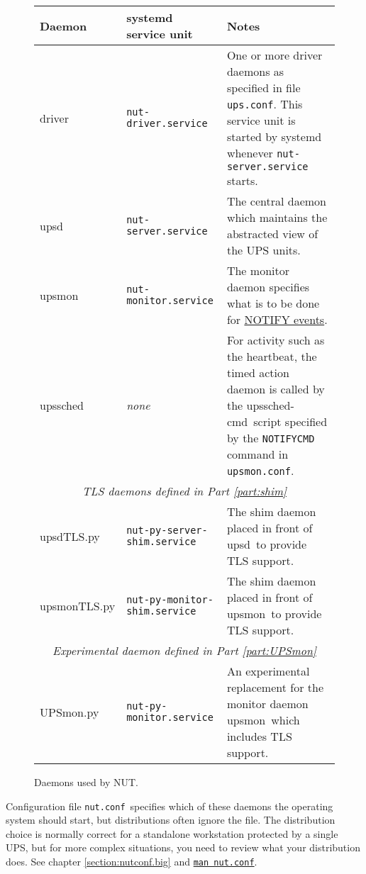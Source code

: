 \documentclass[12pt]{article}
\newcommand{\upsd}{\mbox{\textcolor{UPSDCOLOUR}{upsd}}}
\newcommand{\driver}{\mbox{\textcolor{UPSDCOLOUR}{driver}}}
\newcommand{\upsmon}{\mbox{\textcolor{MONCOLOUR}{upsmon}}}
\newcommand{\upssched}{\mbox{\textcolor{SCHEDCOLOUR}{upssched}}}
\newcommand{\upsschedcmd}{\mbox{\textcolor{CMDCOLOUR}{upssched-cmd}}}
\newcommand{\upsdTLS}{\mbox{\textcolor{UPSDCOLOUR}{upsdTLS.py}}}
\newcommand{\upsmonTLS}{\mbox{\textcolor{UPSMONCOLOUR}{upsmonTLS.py}}}
\newcommand{\UPSmon}{\mbox{\textcolor{UPSMONCOLOUR}{UPSmon.py}}}
\newcommand{\nutconf}{\textcolor{NUTCOLOUR}{\texttt{nut.conf}}}
\newcommand{\upsconf}{\textcolor{UPSDCOLOUR}{\texttt{ups.conf}}}
\newcommand{\upsmonconf}{\textcolor{MONCOLOUR}{\texttt{upsmon.conf}}}
\newcommand{\NUTman}[1]{\href{http://networkupstools.org/docs/man/#1.html}{\texttt{man #1}}}
\newcommand{\Ref}[1]{\ref{#1}}
\begin{document}
\begin{figure}[ht]
\begin{center}
\begin{tabular}{|l|l|p{0.52\LinePrinterwidth}|}
\hline
\textbf{Daemon} & \textbf{systemd service unit} 
            & \textbf{Notes} \\ \hline\hline
\driver     & \texttt{nut-driver.service}
            & One or more driver daemons as specified in file \upsconf.
              This service unit is started by systemd whenever
              \texttt{nut-server.service} starts. \\ \hline
\upsd       & \texttt{nut-server.service}
            & The central daemon which maintains the abstracted view 
              of the UPS units. \\ \hline
\upsmon     & \texttt{nut-monitor.service}
            & The monitor daemon specifies what is to be done for 
              \hyperref[fig:NOTIFYevents]{NOTIFY events}. \\ \hline
\upssched   & \textit{none}
            & For activity such as the heartbeat, the timed action daemon 
              is called by the \upsschedcmd\ script specified 
              by the \texttt{NOTIFYCMD} command in \upsmonconf.  \\ \hline\hline
\multicolumn{3}{|c|}{\textit{TLS daemons defined in Part \ref{part:shim}}} \\ \hline
\upsdTLS    & \texttt{nut-py-server-shim.service}
            & The shim daemon placed in front of \upsd\ to provide TLS support. \\ \hline
\upsmonTLS  & \texttt{nut-py-monitor-shim.service}
            & The shim daemon placed in front of \upsmon\ to provide TLS support. \\ \hline\hline
\multicolumn{3}{|c|}{\textit{Experimental daemon defined in Part \ref{part:UPSmon}}} \\ \hline
\UPSmon     & \texttt{nut-py-monitor.service}
            & An experimental replacement for the monitor daemon \upsmon\ which
              includes TLS support. \\ \hline
\end{tabular}
\caption{Daemons used by NUT.\label{fig:daemons}}
\end{center}
\end{figure}

Configuration file \nutconf\ specifies which of these daemons the operating
system should start, but distributions often ignore the file.  The
distribution choice is normally correct for a standalone workstation protected
by a single UPS, but for more complex situations, you need to review what your
distribution does.  See chapter \Ref{section:nutconf.big} and \NUTman{nut.conf}.
\end{document}
